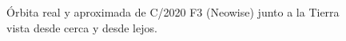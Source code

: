 \begin{figure}[H]
\centering
{}
\caption{Órbita real y aproximada de C/2020 F3 (Neowise) junto a la Tierra vista desde cerca y desde lejos.}
\label{fig:neowise_plot}
\end{figure}

